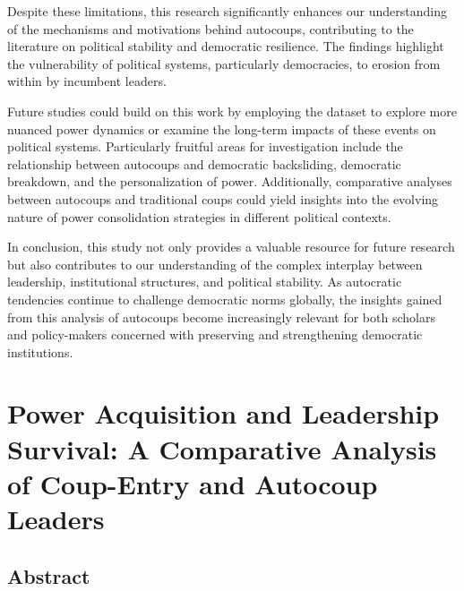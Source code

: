 \documentclass[
  12pt,
]{report}
\begin{document}
Despite these limitations, this research significantly enhances our
understanding of the mechanisms and motivations behind autocoups,
contributing to the literature on political stability and democratic
resilience. The findings highlight the vulnerability of political
systems, particularly democracies, to erosion from within by incumbent
leaders.

Future studies could build on this work by employing the dataset to
explore more nuanced power dynamics or examine the long-term impacts of
these events on political systems. Particularly fruitful areas for
investigation include the relationship between autocoups and democratic
backsliding, democratic breakdown, and the personalization of power.
Additionally, comparative analyses between autocoups and traditional
coups could yield insights into the evolving nature of power
consolidation strategies in different political contexts.

In conclusion, this study not only provides a valuable resource for
future research but also contributes to our understanding of the complex
interplay between leadership, institutional structures, and political
stability. As autocratic tendencies continue to challenge democratic
norms globally, the insights gained from this analysis of autocoups
become increasingly relevant for both scholars and policy-makers
concerned with preserving and strengthening democratic institutions.

\chapter{Power Acquisition and Leadership Survival: A Comparative
Analysis of Coup-Entry and Autocoup
Leaders}\label{power-acquisition-and-leadership-survival-a-comparative-analysis-of-coup-entry-and-autocoup-leaders}

\section*{Abstract}\label{abstract-3}
\end{document}
